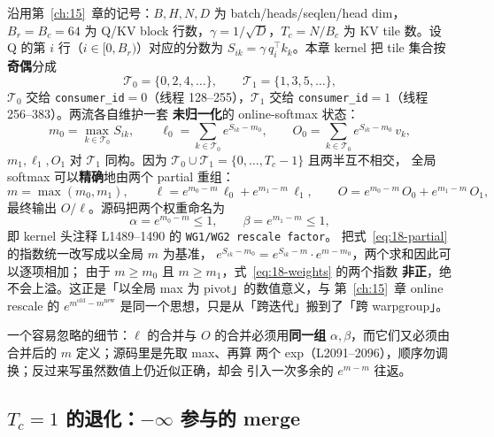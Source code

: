 沿用第~\ref{ch:15}~章的记号：$B, H, N, D$ 为 batch/heads/seqlen/head dim，
$B_r = B_c = 64$ 为 Q/KV block 行数，$\gamma = 1/\sqrt{D}$，$T_c = N/B_c$ 为
KV tile 数。设 Q 的第 $i$ 行（$i \in [0, B_r)$）对应的分数为
$S_{ik} = \gamma\, q_i^\top k_k$。本章 kernel 把 tile 集合按\textbf{奇偶}分成
\begin{equation}
  \mathcal{T}_0 = \{0, 2, 4, \dots\}, \qquad
  \mathcal{T}_1 = \{1, 3, 5, \dots\} ,
  \label{eq:18-split}
\end{equation}
$\mathcal{T}_0$ 交给 \texttt{consumer\_id}$=0$（线程 128--255），$\mathcal{T}_1$
交给 \texttt{consumer\_id}$=1$（线程 256--383）。两流各自维护一套
\textbf{未归一化}的 online-softmax 状态：
\begin{equation}
  m_0 = \max_{k \in \mathcal{T}_0} S_{ik}, \qquad
  \ell_0 = \sum_{k \in \mathcal{T}_0} e^{S_{ik} - m_0}, \qquad
  O_0 = \sum_{k \in \mathcal{T}_0} e^{S_{ik} - m_0}\, v_k ,
  \label{eq:18-partial}
\end{equation}
$m_1, \ell_1, O_1$ 对 $\mathcal{T}_1$ 同构。因为
$\mathcal{T}_0 \cup \mathcal{T}_1 = \{0, \dots, T_c-1\}$ 且两半互不相交，
全局 softmax 可以\textbf{精确}地由两个 partial 重组：
\begin{equation}
  m = \max(m_0, m_1), \qquad
  \ell = e^{m_0 - m}\,\ell_0 + e^{m_1 - m}\,\ell_1, \qquad
  O = e^{m_0 - m}\,O_0 + e^{m_1 - m}\,O_1 ,
  \label{eq:18-merge}
\end{equation}
最终输出 $O/\ell$。源码把两个权重命名为
\begin{equation}
  \alpha = e^{m_0 - m} \le 1, \qquad \beta = e^{m_1 - m} \le 1 ,
  \label{eq:18-weights}
\end{equation}
即 kernel 头注释 L1489--1490 的 \texttt{WG1/WG2 rescale factor}。
把式~\ref{eq:18-partial} 的指数统一改写成以全局 $m$ 为基准，
$e^{S_{ik}-m_0} = e^{S_{ik}-m}\cdot e^{m-m_0}$，两个求和因此可以逐项相加；
由于 $m \ge m_0$ 且 $m \ge m_1$，式~\ref{eq:18-weights} 的两个指数
\textbf{非正}，绝不会上溢。这正是「以全局 max 为 pivot」的数值意义，与
第~\ref{ch:15}~章 online rescale 的 $e^{m^{\mathrm{old}}-m^{\mathrm{new}}}$
是同一个思想，只是从「跨迭代」搬到了「跨 warpgroup」。

一个容易忽略的细节：$\ell$ 的合并与 $O$ 的合并必须用\textbf{同一组}
$\alpha, \beta$，而它们又必须由合并后的 $m$ 定义；源码里是先取 max、再算
两个 exp（L2091--2096），顺序勿调换；反过来写虽然数值上仍近似正确，却会
引入一次多余的 $e^{m-m}$ 往返。

\subsection{$T_c = 1$ 的退化：$-\infty$ 参与的 merge}

